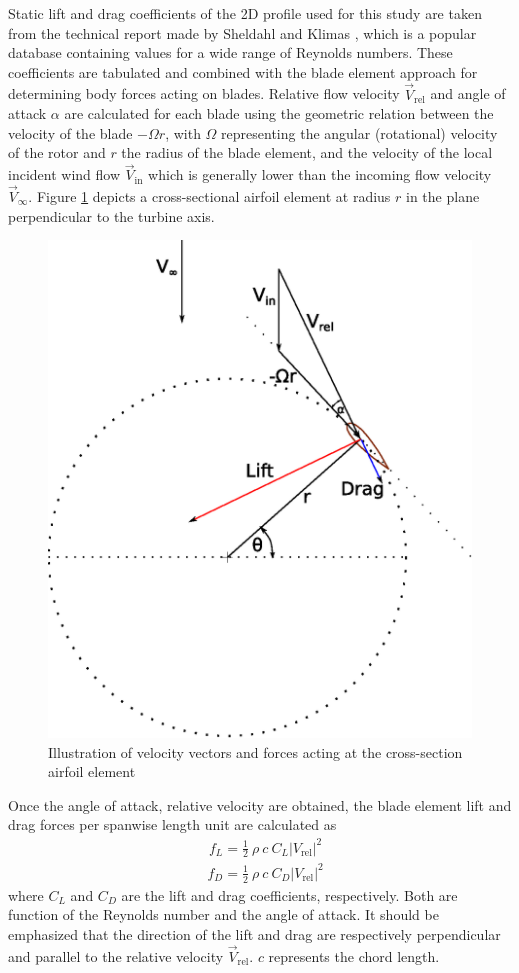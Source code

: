 \documentclass[a4paper]{jpconf}
\begin{document}
Static lift and drag coefficients of the 2D profile used for this study are
taken from the technical report made by Sheldahl and Klimas
\cite{sheldahl1981aerodynamic}, which is a popular database containing values
for a wide range of Reynolds numbers. These coefficients are tabulated and
combined with the blade element approach for determining body forces acting on
blades. Relative flow velocity $\vec{V}_{\mathrm{rel}}$ and angle of attack
$\alpha$ are calculated for each blade using the geometric relation between the
velocity of the blade $- \Omega r$, with $\Omega$ representing the angular
(rotational) velocity of the rotor and $r$ the radius of the blade element, and
the velocity of the local incident wind flow $\vec{V}_{\mathrm{in}}$ which is generally lower than the incoming flow velocity $\vec{V}_{\infty}$. Figure
\ref{figvectors} depicts a cross-sectional airfoil element at radius $r$ in the
plane perpendicular to the turbine axis.

\begin{figure}[h]
\begin{center}
\includegraphics[width=0.33\columnwidth]{vector2.eps}
\end{center}
\caption{\label{figvectors} Illustration of velocity vectors and forces acting at the cross-section airfoil element}
\end{figure}

Once the angle of attack, relative velocity are obtained, the blade element lift and drag forces per spanwise length unit are calculated as
\begin{align}
& f_L = \frac{1}{2} \ \rho \ c \ C_L \left| V_{\mathrm{rel}} \right|^2  \label{lift}
\end{align} %
\begin{align}
& f_D = \frac{1}{2} \ \rho \ c \ C_D \left| V_{\mathrm{rel}} \right|^2  \label{drag}
\end{align} %
where $C_L$ and $C_D$ are the lift and drag coefficients, respectively. Both are
function of the Reynolds number and the angle of attack. It should be emphasized
that the direction of the lift and drag are respectively perpendicular and
parallel to the relative velocity $\vec{V}_{\mathrm{rel}}$. $c$ represents the
chord length.
\end{document}
